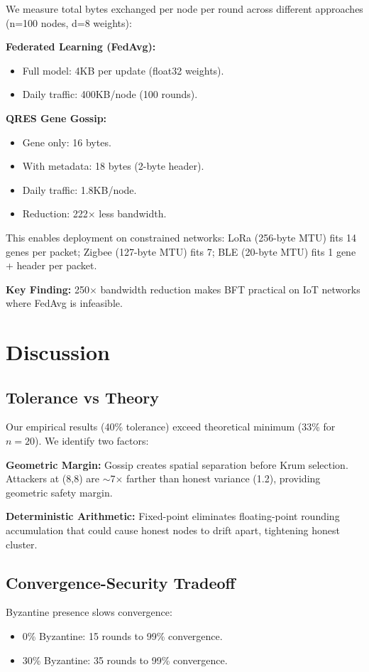 \documentclass[conference,10pt]{IEEEtran}
\begin{document}
We measure total bytes exchanged per node per round across different approaches (n=100 nodes, d=8 weights):

\textbf{Federated Learning (FedAvg):}
\begin{itemize}
    \item Full model: 4KB per update (float32 weights).
    \item Daily traffic: 400KB/node (100 rounds).
\end{itemize}

\textbf{QRES Gene Gossip:}
\begin{itemize}
    \item Gene only: 16 bytes.
    \item With metadata: 18 bytes (2-byte header).
    \item Daily traffic: 1.8KB/node.
    \item Reduction: 222$\times$ less bandwidth.
\end{itemize}

This enables deployment on constrained networks: LoRa (256-byte MTU) fits 14 genes per packet; Zigbee (127-byte MTU) fits 7; BLE (20-byte MTU) fits 1 gene + header per packet.

\textbf{Key Finding:} 250$\times$ bandwidth reduction makes BFT practical on IoT networks where FedAvg is infeasible.

\section{Discussion}
\label{sec:discussion}

\subsection{Tolerance vs Theory}
Our empirical results (40\% tolerance) exceed theoretical minimum (33\% for $n=20$). We identify two factors:

\textbf{Geometric Margin:} Gossip creates spatial separation before Krum selection. Attackers at (8,8) are $\sim$7$\times$ farther than honest variance (1.2), providing geometric safety margin.

\textbf{Deterministic Arithmetic:} Fixed-point eliminates floating-point rounding accumulation that could cause honest nodes to drift apart, tightening honest cluster.

\subsection{Convergence-Security Tradeoff}
Byzantine presence slows convergence:
\begin{itemize}
    \item 0\% Byzantine: 15 rounds to 99\% convergence.
    \item 30\% Byzantine: 35 rounds to 99\% convergence.
\end{itemize}
\end{document}
